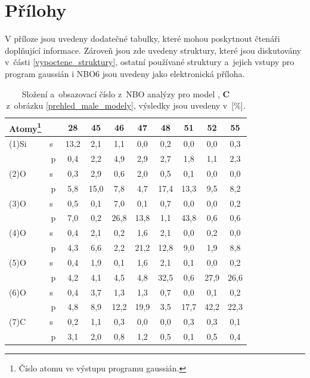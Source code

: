 \documentclass[
digital, %
table,   %
lof,     %
lot,     %
oneside,
]{fithesis3}
\begin{document}
\chapter{Přílohy}
V příloze jsou uvedeny dodatečné tabulky, které mohou poskytnout čtenáři doplňující informace. Zároveň jsou zde uvedeny struktury, které jsou diskutovány v~části \ref{vypoctene_struktury}, ostatní používané struktury a~jejich vstupy pro program gaussián i NBO6 jsou uvedeny jako elektronická příloha.
\begin{table}[H]
\begin{minipage}{\textwidth}
\caption{Složení a~obsazovací číslo z~NBO analýzy pro model ,  \textbf{C} z~obrázku \ref{prehled_male_modely}, výsledky jsou uvedeny v~[\%].}
\begin{center}
\begin{tabular}{|l|c|c|c|c|c|c|c|c|c|}
\hline
\label{si_ch3_och3_5_MPA}Atomy\footnote{Číslo atomu ve výstupu programu gaussián.}  &  & 28 & 45 & 46 & 47 & 48 & 51 & 52 & 55 \\ \hline
(1)Si & s~& 13,2  & 2,1  & 1,1  & 0,0  & 0,2  & 0,0  & 0,0  & 0,3  \\ \hline
& p & 0,4  & 2,2  & 4,9  & 2,9  & 2,7  & 1,8  & 1,1  & 2,3  \\ \hline
(2)O & s~& 0,3  & 2,9  & 0,6  & 2,0  & 0,5  & 0,1  & 0,0  & 0,0  \\ \hline
& p & 5,8  & 15,0  & 7,8  & 4,7  & 17,4  & 13,3  & 9,5  & 8,2  \\ \hline
(3)O & s~& 0,5  & 0,1  & 7,0  & 0,1  & 0,7  & 0,0  & 0,0  & 0,2  \\ \hline
& p & 7,0  & 0,2  & 26,8  & 13,8  & 1,1  & 43,8  & 0,6  & 0,6  \\ \hline
(4)O & s~& 0,4  & 2,1  & 0,2  & 1,6  & 2,1  & 0,0  & 0,2  & 0,0  \\ \hline
& p & 4,3  & 6,6  & 2,2  & 21,2  & 12,8  & 9,0  & 1,9  & 8,8  \\ \hline
(5)O & s~& 0,4  & 1,9  & 0,1  & 1,6  & 2,1  & 0,1  & 0,0  & 0,2  \\ \hline
& p & 4,2  & 4,1  & 4,5  & 4,8  & 32,5  & 0,6  & 27,9  & 26,6  \\ \hline
(6)O & s~& 0,4  & 3,7  & 1,3  & 1,3  & 0,7  & 0,0  & 0,1  & 0,2  \\ \hline
& p & 4,8  & 8,9  & 12,2  & 19,9  & 3,5  & 17,7  & 42,2  & 22,3  \\ \hline
(7)C & s~& 0,2  & 1,1  & 0,3  & 0,0  & 0,0  & 0,3  & 0,3  & 0,1  \\ \hline
& p & 3,1  & 2,0  & 0,8  & 1,2  & 0,5  & 0,1  & 0,5  & 0,4  \\ \hline
\end{tabular}\end{center}\end{minipage}
\end{table}
\end{document}
